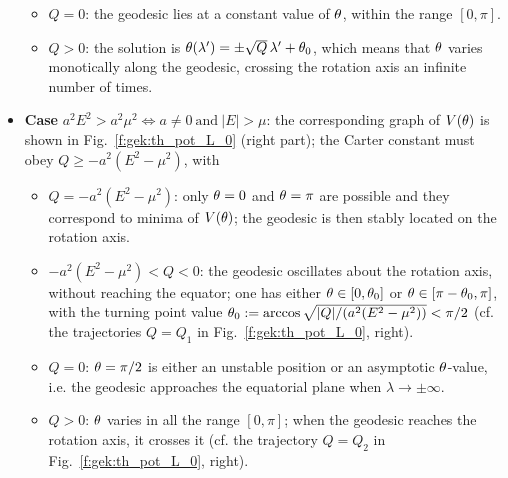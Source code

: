 \begin{itemize}
\begin{itemize}
\item $Q=0$: the geodesic lies at a constant value of $\theta$, within the range
$[0,\pi]$.
\item $Q>0$: the solution is $\theta(\lambda') = \pm \sqrt{Q}\, \lambda' + \theta_0$, which
means that $\theta$ varies monotically along the geodesic, crossing the rotation
axis an infinite number of times.
\end{itemize}
\item \textbf{Case} $a^2 E^2 > a^2 \mu^2 \iff a\neq 0 \ \mbox{and}\  |E|>\mu$:
the corresponding graph of $V(\theta)$ is shown in
Fig.~\ref{f:gek:th_pot_L_0} (right part); the Carter constant must obey
$Q \geq - a^2 (E^2 - \mu^2)$, with
\begin{itemize}
\item $Q=-a^2(E^2 - \mu^2)$: only $\theta=0$ and
$\theta=\pi$ are possible and they correspond to minima of $V(\theta)$;
the geodesic is then stably located on the rotation axis.
\item $-a^2(E^2 - \mu^2) < Q < 0$: the geodesic oscillates about the rotation
axis, without reaching the equator; one has either $\theta\in[0,\theta_0]$ or
$\theta\in [\pi - \theta_0,\pi]$, with the turning point value
$\theta_0 := \arccos\sqrt{|Q|/(a^2(E^2 - \mu^2))} < \pi/2$ (cf. the trajectories $Q=Q_1$ in Fig.~\ref{f:gek:th_pot_L_0}, right).
\item $Q=0$: $\theta=\pi/2$ is either an unstable position or
an asymptotic $\theta$-value, i.e. the geodesic approaches the equatorial
plane when $\lambda\to\pm\infty$.
\item $Q>0$: $\theta$ varies in all the range $[0,\pi]$; when
the geodesic reaches the rotation axis, it crosses it (cf. the trajectory $Q=Q_2$ in Fig.~\ref{f:gek:th_pot_L_0}, right).
\end{itemize}
\end{itemize}

